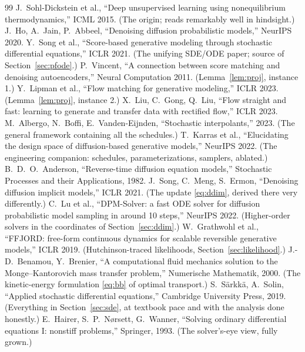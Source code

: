 \documentclass[10pt,a4paper]{article}
\begin{document}
\begin{thebibliography}{99}\small
{} J.~Sohl-Dickstein et al., ``Deep unsupervised learning
using nonequilibrium thermodynamics,'' ICML 2015. (The origin; reads
remarkably well in hindsight.)
 J.~Ho, A.~Jain, P.~Abbeel, ``Denoising diffusion
probabilistic models,'' NeurIPS 2020.
 Y.~Song et al., ``Score-based generative modeling through
stochastic differential equations,'' ICLR 2021. (The unifying SDE/ODE
paper; source of Section~\ref{sec:pfode}.)
 P.~Vincent, ``A connection between score matching and
denoising autoencoders,'' Neural Computation 2011. (Lemma~\ref{lem:proj},
instance 1.)
 Y.~Lipman et al., ``Flow matching for generative
modeling,'' ICLR 2023. (Lemma~\ref{lem:proj}, instance 2.)
 X.~Liu, C.~Gong, Q.~Liu, ``Flow straight and fast: learning
to generate and transfer data with rectified flow,'' ICLR 2023.
 M.~Albergo, N.~Boffi, E.~Vanden-Eijnden, ``Stochastic
interpolants,'' 2023. (The general framework containing all the schedules.)
 T.~Karras et al., ``Elucidating the design space of
diffusion-based generative models,'' NeurIPS 2022. (The engineering
companion: schedules, parameterizations, samplers, ablated.)
 B.~D.~O.~Anderson, ``Reverse-time diffusion equation
models,'' Stochastic Processes and their Applications, 1982.
 J.~Song, C.~Meng, S.~Ermon, ``Denoising diffusion
implicit models,'' ICLR 2021. (The update \eqref{eq:ddim}, derived there
very differently.)
 C.~Lu et al., ``DPM-Solver: a fast ODE solver for
diffusion probabilistic model sampling in around 10 steps,'' NeurIPS
2022. (Higher-order solvers in the coordinates of
Section~\ref{sec:ddim}.)
 W.~Grathwohl et al., ``FFJORD: free-form continuous
dynamics for scalable reversible generative models,'' ICLR 2019.
(Hutchinson-traced likelihoods, Section~\ref{sec:likelihood}.)
 J.-D.~Benamou, Y.~Brenier, ``A computational fluid
mechanics solution to the Monge--Kantorovich mass transfer problem,''
Numerische Mathematik, 2000. (The kinetic-energy formulation
\eqref{eq:bb} of optimal transport.)
 S.~S\"arkk\"a, A.~Solin, ``Applied stochastic
differential equations,'' Cambridge University Press, 2019. (Everything
in Section~\ref{sec:sde}, at textbook pace and with the analysis done
honestly.)
 E.~Hairer, S.~P.~N\o rsett, G.~Wanner, ``Solving
ordinary differential equations I: nonstiff problems,'' Springer, 1993.
(The solver's-eye view, fully grown.)
\end{thebibliography}
\end{document}
